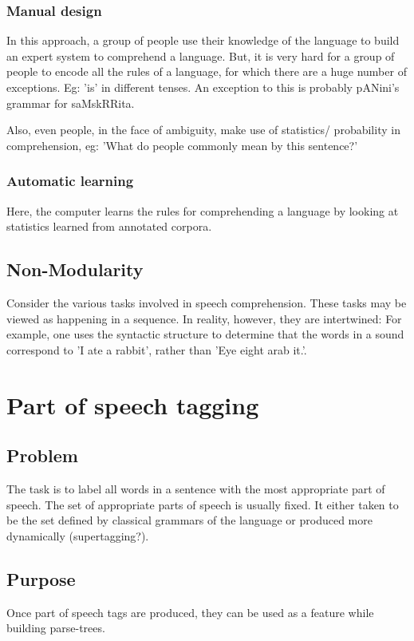 \documentclass[oneside, article]{memoir}
\begin{document}
\subsubsection{Manual design}
In this approach, a group of people use their knowledge of the language to build an expert system to comprehend a language. But, it is very hard for a group of people to encode all the rules of a language, for which there are a huge number of exceptions. Eg: 'is' in different tenses. An exception to this is probably pANini's grammar for saMskRRita.

Also, even people, in the face of ambiguity, make use of statistics/ probability in comprehension, eg: 'What do people commonly mean by this sentence?'

\subsubsection{Automatic learning}
Here, the computer learns the rules for comprehending a language by looking at statistics learned from annotated corpora.

\subsection{Non-Modularity}
Consider the various tasks involved in speech comprehension. These tasks may be viewed as happening in a sequence. In reality, however, they are intertwined: For example, one uses the syntactic structure to determine that the words in a sound correspond to 'I ate a rabbit', rather than 'Eye eight arab it.'.

\section{Part of speech tagging}
\subsection{Problem}
The task is to label all words in a sentence with the most appropriate part of speech. The set of appropriate parts of speech is usually fixed. It either taken to be the set defined by classical grammars of the language or produced more dynamically (supertagging?).

\subsection{Purpose}
Once part of speech tags are produced, they can be used as a feature while building parse-trees.
\end{document}
